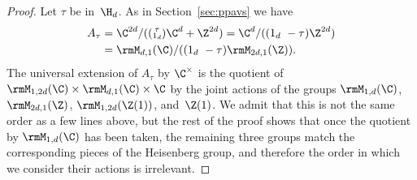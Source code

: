 \begin{proof}
Let $\tau$ be in~$\H_d$. As in Section~\ref{sec:ppavs} we have
\[
\begin{aligned}
A_\tau& =\C^{2d}/((\substack{\tau\\ 1_d})\C^d+\Z^{2d}) =
\C^d/((1_d\,\,-\tau)\Z^{2d}) \\
& = \rmM_{d,1}(\C)/((1_d\,\,-\tau)\rmM_{2d,1}(\Z)).
\end{aligned}
\]
The universal extension of $A_\tau$ by $\C^\times$ is the quotient of
$\rmM_{1,2d}(\C)\times \rmM_{d,1}(\C)\times\C$ by the
joint actions of the groups
$\rmM_{1,d}(\C)$, $\rmM_{2d,1}(\Z)$, $\rmM_{1,2d}(\Z(1))$,
and~$\Z(1)$.
We admit that this is not the same order as a few lines above, but the
rest of the proof shows that once the quotient by $\rmM_{1,d}(\C)$ has
been taken, the remaining three groups match the corresponding pieces of
the Heisenberg group, and therefore the order in which we consider their
actions is irrelevant.

\Changel


\end{proof}
